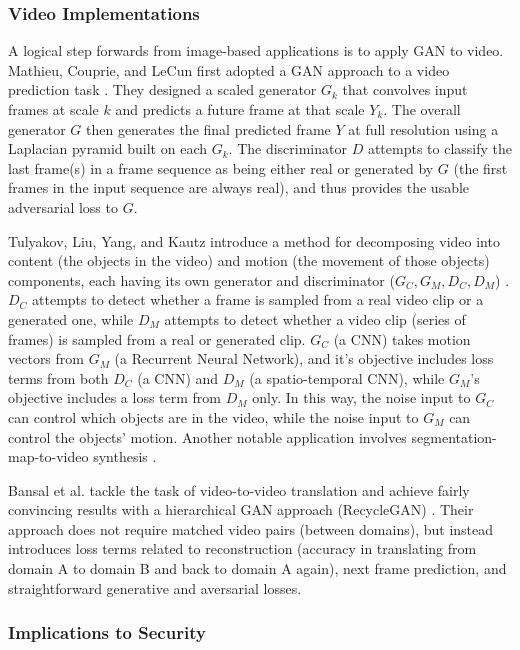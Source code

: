 \documentclass[11pt]{article}
\begin{document}
\subsubsection{Video Implementations}

A logical step forwards from image-based applications is to apply GAN to video.  Mathieu, Couprie, and LeCun first adopted a GAN approach to a video prediction task \cite{Mathieu2015DeepMV}.  They designed a scaled generator $G_k$ that convolves input frames at scale $k$ and predicts a future frame at that scale $Y_k$.  The overall generator $G$ then generates the final predicted frame $Y$ at full resolution using a Laplacian pyramid \cite{denton2015deep} built on each $G_k$.  The discriminator $D$ attempts to classify the last frame(s) in a frame sequence as being either real or generated by $G$ (the first frames in the input sequence are always real), and thus provides the usable adversarial loss to $G$.

Tulyakov, Liu, Yang, and Kautz introduce a method for decomposing video into content (the objects in the video) and motion (the movement of those objects) components, each having its own generator and discriminator ($G_C, G_M, D_C, D_M$) \cite{tulyakov2017mocogan}.  $D_C$ attempts to detect whether a frame is sampled from a real video clip or a generated one, while $D_M$ attempts to detect whether a video clip (series of frames) is sampled from a real or generated clip.  $G_C$ (a CNN) takes motion vectors from $G_M$ (a Recurrent Neural Network), and it's objective includes loss terms from both $D_C$ (a CNN) and $D_M$ (a spatio-temporal CNN), while $G_M$'s objective includes a loss term from $D_M$ only.  In this way, the noise input to $G_C$ can control which objects are in the video, while the noise input to $G_M$ can control the objects' motion.  Another notable application involves segmentation-map-to-video synthesis \cite{wang2018videotovideo}.

Bansal et al. tackle the task of video-to-video translation and achieve fairly convincing results with a hierarchical GAN approach (RecycleGAN) \cite{bansal2018recyclegan}.  Their approach does not require matched video pairs (between domains), but instead introduces loss terms related to reconstruction (accuracy in translating from domain A to domain B and back to domain A again), next frame prediction, and straightforward generative and aversarial losses.

\subsubsection{Implications to Security}
\end{document}
